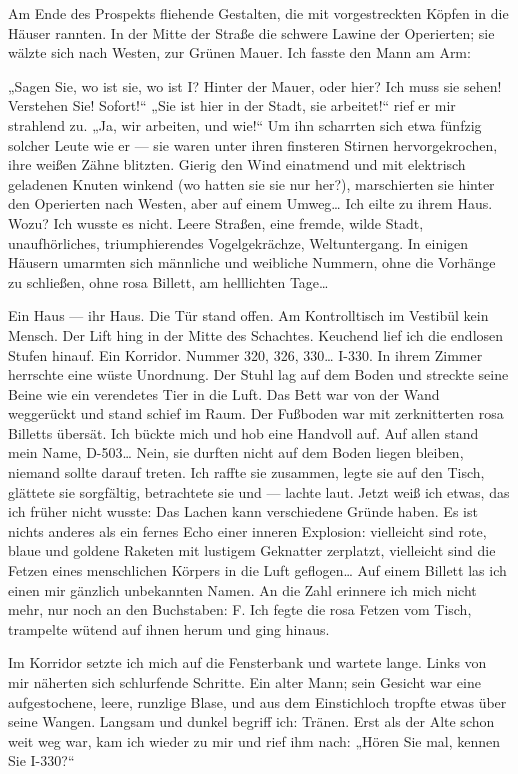 Am Ende des Prospekts fliehende Gestalten, die mit vorgestreckten
Köpfen in die Häuser rannten. In der Mitte der Straße die schwere
Lawine der Operierten; sie wälzte sich nach Westen, zur Grünen
Mauer. Ich fasste den Mann am Arm:

„Sagen Sie, wo ist sie, wo ist I? Hinter der Mauer, oder hier? Ich
muss sie sehen! Verstehen Sie! Sofort!“ „Sie ist hier in der Stadt,
sie arbeitet!“ rief er mir strahlend zu. „Ja, wir arbeiten, und
wie!“ Um ihn scharrten sich etwa fünfzig solcher Leute wie er — sie
waren unter ihren finsteren Stirnen hervorgekrochen, ihre weißen
Zähne blitzten. Gierig den Wind einatmend und mit elektrisch
geladenen Knuten winkend
(wo hatten sie sie nur her?), marschierten sie hinter den
Operierten nach Westen, aber auf einem Umweg\ldots{} Ich eilte zu ihrem
Haus. Wozu? Ich wusste es nicht. Leere Straßen, eine fremde, wilde
Stadt, unaufhörliches, triumphierendes Vogelgekrächze,
Weltuntergang. In einigen Häusern umarmten sich männliche und
weibliche Nummern, ohne die Vorhänge zu schließen, ohne rosa
Billett, am helllichten Tage\ldots{}

Ein Haus — ihr Haus. Die Tür stand offen. Am Kontrolltisch im
Vestibül kein Mensch. Der Lift hing in der Mitte des Schachtes.
Keuchend lief ich die endlosen Stufen hinauf. Ein Korridor. Nummer
320, 326, 330\ldots{} I-330. In ihrem Zimmer herrschte eine wüste
Unordnung. Der Stuhl lag auf dem Boden und streckte seine Beine wie
ein verendetes Tier in die Luft. Das Bett war von der Wand
weggerückt und stand schief im Raum. Der Fußboden war mit
zerknitterten rosa Billetts übersät. Ich bückte mich und hob eine
Handvoll auf. Auf allen stand mein Name, D-503\ldots{} Nein, sie durften
nicht auf dem Boden liegen bleiben, niemand sollte darauf treten.
Ich raffte sie zusammen, legte sie auf den Tisch, glättete sie
sorgfältig, betrachtete sie und — lachte laut. Jetzt weiß ich
etwas, das ich früher nicht wusste: Das Lachen kann verschiedene
Gründe haben. Es ist nichts anderes als ein fernes Echo einer
inneren Explosion: vielleicht sind rote, blaue und goldene Raketen
mit lustigem Geknatter zerplatzt, vielleicht sind die Fetzen eines
menschlichen Körpers in die Luft geflogen\ldots{} Auf einem Billett las
ich einen mir gänzlich unbekannten Namen. An die Zahl erinnere ich
mich nicht mehr, nur noch an den Buchstaben: F. Ich fegte die rosa
Fetzen vom Tisch, trampelte wütend auf ihnen herum und ging
hinaus.

Im Korridor setzte ich mich auf die Fensterbank und wartete lange.
Links von mir näherten sich schlurfende Schritte. Ein alter Mann;
sein Gesicht war eine aufgestochene, leere, runzlige Blase, und aus
dem Einstichloch tropfte etwas über seine Wangen. Langsam und
dunkel begriff ich: Tränen. Erst als der Alte schon weit weg war,
kam ich wieder zu mir und rief ihm nach: „Hören Sie mal, kennen Sie
I-330?“

